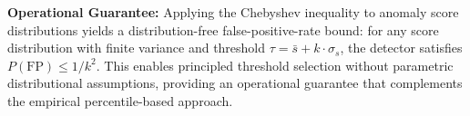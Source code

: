 \vspace{6pt}
\noindent\textbf{Operational Guarantee:} Applying the Chebyshev inequality to anomaly score distributions yields a distribution-free false-positive-rate bound: for any score distribution with finite variance and threshold \(\tau = \bar{s} + k \cdot \sigma_s\), the detector satisfies \(P(\text{FP}) \leq 1/k^2\). This enables principled threshold selection without parametric distributional assumptions, providing an operational guarantee that complements the empirical percentile-based approach.
